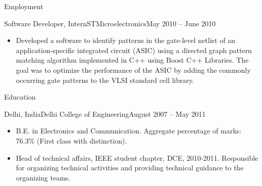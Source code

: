 \documentclass[]{mukeshcv}
\begin{document}
\begin{cvsection}{Employment}
		\begin{cvsubsection}{Software Developer, Intern}{STMicroelectronics}{May 2010 -- June 2010}
			\begin{itemize}
				\item Developed a software to identify patterns in the gate-level netlist of an application-specific integrated circuit (ASIC) using a directed graph pattern matching algorithm implemented in C++ using Boost C++ Libraries. The goal was to optimize the performance of the ASIC by adding the commonly occurring gate patterns to the VLSI standard cell library. 
			\end{itemize}
		\end{cvsubsection}
	\end{cvsection}
	
	\begin{cvsection}{Education}
		\begin{cvsubsection}{Delhi, India}{Delhi College of Engineering}{August 2007 -- May 2011}
			\begin{itemize}
				\item B.E. in Electronics and Communication. Aggregate percentage of marks: 76.3\% (First class with distinction).
				\item Head of technical affairs, IEEE student chapter, DCE, 2010-2011. Responsible for organizing technical activities and providing technical guidance to the organizing teams.	
			\end{itemize}
		\end{cvsubsection}
	\end{cvsection}
\end{document}

